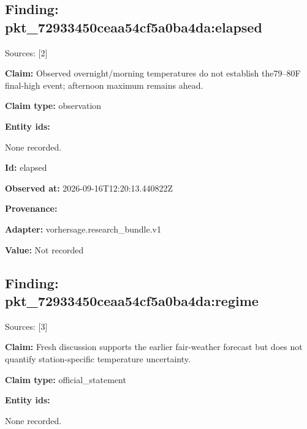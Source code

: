 \documentclass[11pt]{article}
\begin{document}
\subsection*{\textcolor{epdarkgreen}{Finding: pkt\_72933450\hspace{0pt}ceaa54cf5a0b\hspace{0pt}a4da:elapsed}}
Sources: [2]


\par\noindent\textbf{Claim:} Observed overnight/morning temperatures do not establish the79–80F final-high event; afternoon maximum remains ahead.

\par\noindent\textbf{Claim type:} observation

\par\noindent\textbf{Entity ids:} \par None recorded.

\par\noindent\textbf{Id:} elapsed

\par\noindent\textbf{Observed at:} 2026-09-16T12:20:13.440822Z

\par\noindent\textbf{Provenance:} \par \par\noindent\textbf{Adapter:} vorhersage.r\hspace{0pt}esearch\_bund\hspace{0pt}le.v1

\par\noindent\textbf{Value:} Not recorded

\subsection*{\textcolor{epdarkgreen}{Finding: pkt\_72933450\hspace{0pt}ceaa54cf5a0b\hspace{0pt}a4da:regime}}
Sources: [3]


\par\noindent\textbf{Claim:} Fresh discussion supports the earlier fair-weather forecast but does not quantify station-specific temperature uncertainty.

\par\noindent\textbf{Claim type:} official\_statement

\par\noindent\textbf{Entity ids:} \par None recorded.
\end{document}
